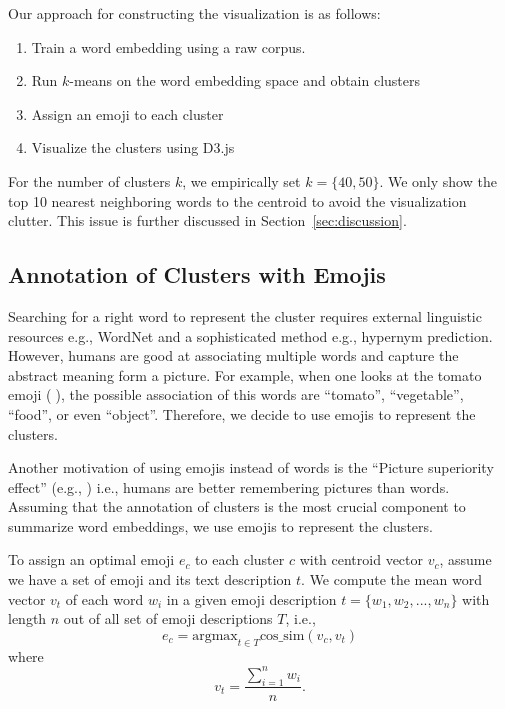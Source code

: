 Our approach for constructing the visualization is as follows:
\begin{enumerate}
 \item Train a word embedding using a raw corpus. 
 \item Run $k$-means \cite{lloyd1982least} on the word embedding space and obtain clusters
 \item Assign an emoji to each cluster
 \item Visualize the clusters using D3.js \cite{Bostock:2011:DDD:2068462.2068631}
\end{enumerate}
For the number of clusters $k$, we empirically set $k = \{40, 50\}$. 
We only show the top 10 nearest neighboring words to the centroid to avoid the visualization clutter. This issue is further discussed in Section~\ref{sec:discussion}.

\subsection{Annotation of Clusters with Emojis}
Searching for a right word to represent the cluster requires external linguistic resources e.g., WordNet and a sophisticated method e.g., hypernym prediction. 
However, humans are good at associating multiple words and capture the abstract meaning form a picture.  
For example, when one looks at the tomato emoji (🍅), the possible association of this words are ``tomato'', ``vegetable'', ``food'', or even ``object''. 
Therefore, we decide to use emojis to represent the clusters. 

Another motivation of using emojis instead of words is the ``Picture superiority effect'' (e.g., \cite{doi:10.1162/jocn.2010.21464}) i.e., humans are better remembering pictures than words. 
Assuming that the annotation of clusters is the most crucial component to summarize word embeddings, we use emojis to represent the clusters.  

To assign an optimal emoji $e_c$ to each cluster $c$ with centroid vector $v_c$, assume we have a set of emoji and its text description $t$. 
We compute the mean word vector $v_t$ of each word $w_i$ in a given emoji description $t = \{w_1, w_2, ..., w_n\}$ with length $n$ out of all set of emoji descriptions $T$, i.e.,
\begin{equation}
 e_c =  \text{argmax}_{t \in T} \text{cos\_sim}(v_c, v_t)
\end{equation}
where 
\begin{equation}
 v_t = \frac{\sum_{i = 1}^{n} w_i}{n}. 
\end{equation}

